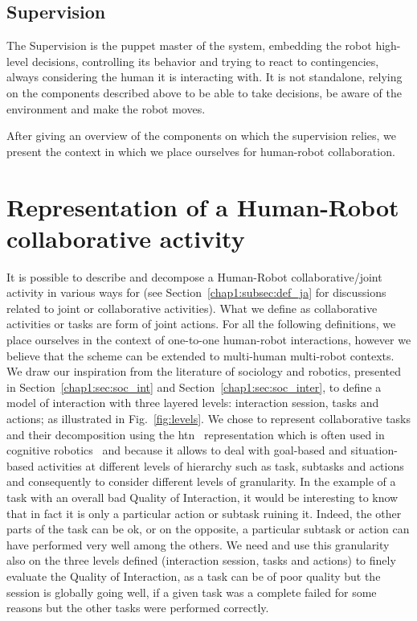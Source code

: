 \documentclass[a4paper,11pt,twoside]{StyleThese}
\begin{document}
\subsection{Supervision}
The Supervision is the puppet master of the system, embedding the robot high-level decisions, controlling its behavior and trying to react to contingencies, always considering the human it is interacting with. It is not standalone, relying on the components described above to be able to take decisions, be aware of the environment and make the robot moves.
\newline

After giving an overview of the components on which the supervision relies, we present the context in which we place ourselves for human-robot collaboration.

\section{Representation of a Human-Robot collaborative activity}\label{chap2:sec:levels}
It is possible to describe and decompose a Human-Robot collaborative/joint activity in various ways for (see Section~\ref{chap1:subsec:def_ja} for discussions related to joint or collaborative activities). What we define as collaborative activities or tasks are form of joint actions. For all the following definitions, we place ourselves in the context of one-to-one human-robot interactions, however we  believe that the scheme can be extended to multi-human multi-robot contexts. 
We draw our inspiration from the literature of sociology and robotics, presented in Section~\ref{chap1:sec:soc_int} and Section~\ref{chap1:sec:soc_inter}, to define a model of interaction with three layered levels: interaction session, tasks and actions; as illustrated in Fig.~\ref{fig:levels}. We chose to represent collaborative tasks and their decomposition using the \acrfull{htn}~\cite{ghallab_2016_automated} representation which is often used in cognitive robotics~\cite{ingrand-2017,lallement_2014_hatp, buisan_2021_human} and because it allows to deal with goal-based and situation-based activities at different levels of hierarchy such as task, subtasks and actions and consequently to consider different levels of granularity. In the example of a task with an overall bad Quality of Interaction, it would be interesting to know that in fact it is only a particular action or subtask ruining it. Indeed, the other parts of the task can be ok, or on the opposite, a particular subtask or action can have performed very well among the others. We need and use this granularity also on the three levels defined (interaction session, tasks and actions) to finely evaluate the Quality of Interaction, as a task can be of poor quality but the session is globally going well, \eg if a given task was a complete failed for some reasons but the other tasks were performed correctly. 
\end{document}
